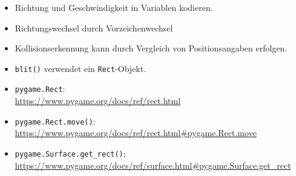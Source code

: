 \begin{itemize}
	\item Richtung und Geschwindigkeit in Variablen kodieren.

	\item Richtungswechsel durch Vorzeichenwechsel
	
	\item Kollisionserkennung kann durch Vergleich von Positionsangaben erfolgen.
	
	\item \texttt{blit()} verwendet ein \texttt{Rect}-Objekt.
	
	\item \texttt{pygame.Rect}:
	\\
	\url{https://www.pygame.org/docs/ref/rect.html}
	
	\item \texttt{pygame.Rect.move()}:
    \\
    \url{https://www.pygame.org/docs/ref/rect.html#pygame.Rect.move}

	\item \texttt{pygame.Surface.get\_rect()}:
	\\
	\url{https://www.pygame.org/docs/ref/surface.html#pygame.Surface.get_rect}

\end{itemize}

